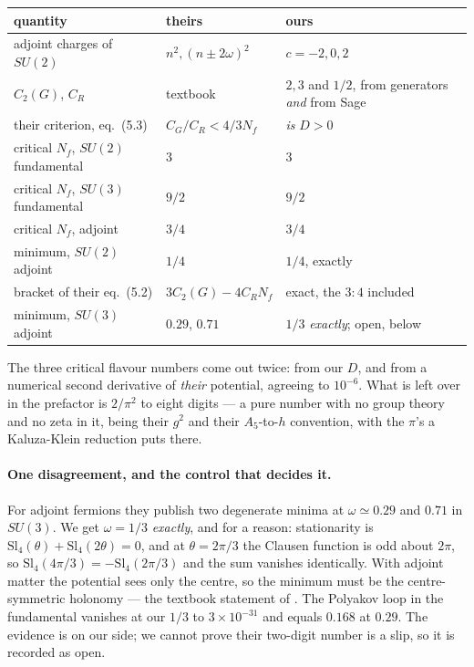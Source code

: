 \documentclass[11pt,a4paper]{article}
\newcommand{\su}[1]{SU(#1)}
\begin{document}
\begin{center}\small
{}
\begin{tabular}{lll}
\toprule
\rowcolor{hdrblue!10}quantity & theirs & ours\\
\midrule
adjoint charges of $\su2$ & $n^2,(n\pm2\omega)^2$ & $c=-2,0,2$\\
$C_2(G)$, $C_R$ & textbook & $2,3$ and $1/2$, from generators \emph{and} from Sage\\
their criterion, eq.~(5.3) & $C_G/C_R<4/3N_f$ & \emph{is} $D>0$\\
critical $N_f$, $\su2$ fundamental & $3$ & $3$\\
critical $N_f$, $\su3$ fundamental & $9/2$ & $9/2$\\
critical $N_f$, adjoint & $3/4$ & $3/4$\\
minimum, $\su2$ adjoint & $1/4$ & $1/4$, exactly\\
bracket of their eq.~(5.2) & $3C_2(G)-4C_RN_f$ & exact, the $3\!:\!4$ included\\
\rowcolor{warmred!13}minimum, $\su3$ adjoint & $0.29$, $0.71$ & $1/3$ \emph{exactly}; open, below\\
\bottomrule
\end{tabular}
\end{center}

\noindent The three critical flavour numbers come out twice: from our $D$, and from a numerical
second derivative of \emph{their} potential, agreeing to $10^{-6}$. What is left over in the
prefactor is $2/\pi^2$ to eight digits --- a pure number with no group theory and no zeta in it,
being their $g^2$ and their $A_5$-to-$h$ convention, with the $\pi$'s a Kaluza-Klein reduction puts
there.

\paragraph{One disagreement, and the control that decides it.} For adjoint fermions they publish two
degenerate minima at $\omega\simeq0.29$ and $0.71$ in $\su3$. We get $\omega=1/3$ \emph{exactly}, and
for a reason: stationarity is $\mathrm{Sl}_4(\theta)+\mathrm{Sl}_4(2\theta)=0$, and at
$\theta=2\pi/3$ the Clausen function is odd about $2\pi$, so
$\mathrm{Sl}_4(4\pi/3)=-\mathrm{Sl}_4(2\pi/3)$ and the sum vanishes identically. With adjoint matter
the potential sees only the centre, so the minimum must be the centre-symmetric holonomy --- the
textbook statement of \cite{GPY}. The Polyakov loop in the fundamental vanishes at our $1/3$ to
$3\times10^{-31}$ and equals $0.168$ at $0.29$. The evidence is on our side; we cannot prove their
two-digit number is a slip, so it is recorded as open.
\end{document}
